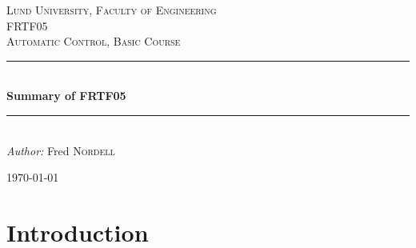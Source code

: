 \documentclass[12pt]{article} %
\begin{document}

\begin{titlepage}

\newcommand{\HRule}{\rule{\linewidth}{0.5mm}} %

\center %

\textsc{\LARGE Lund University, Faculty of Engineering}\\[1.5cm] %
\textsc{\Large FRTF05}\\[0.5cm] %
\textsc{\large Automatic Control, Basic Course}\\[0.5cm] %

\HRule \\[1cm]
{ \huge \bfseries Summary of FRTF05}\\[0.4cm] %
\HRule \\[1.5cm]

\emph{Author:} Fred \textsc{Nordell} %

{\large \today}\\[3cm] %


\vfill %

\end{titlepage}


\tableofcontents %
\lstlistoflistings %
\listoffigures %
\listoftables %

\newpage %


\section{Introduction} %
\end{document}
